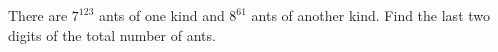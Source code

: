 There are $7^{123}$ ants of one kind and $8^{61}$ ants of another kind. Find the last two digits of the total number of ants.
